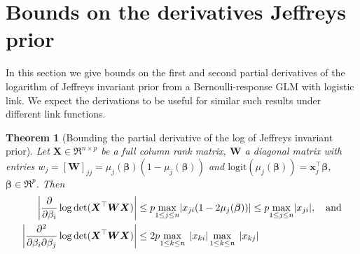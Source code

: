 \documentclass[11pt, a4paper]{article}
\newcommand*{\bb}{\boldsymbol}
\theoremstyle{example} \newtheorem{example}{Example}[section]
\theoremstyle{theorem} \newtheorem{theorem}{Theorem}[section]
\theoremstyle{theorem }\newtheorem{proposition}{Proposition}[section]
\theoremstyle{theorem }\newtheorem{corollary}{Corollary}[section]
\def\det{{\mathop{\rm det}}}
\def\\bbeta{\bb{\\bbeta}}
\begin{document}
	\section{Bounds on the derivatives Jeffreys prior}
\label{sec:jeffreys}
In this section we give bounds on the first and second partial derivatives of the logarithm of Jeffreys invariant prior from a Bernoulli-response GLM with logistic link. We expect the derivations to be useful for similar such results under different link functions. 
 
\begin{theorem}[Bounding the partial derivative of the log of Jeffreys invariant prior]\label{thm:jeffrey_deriv_bound}
	Let $\bb X \in \Re^{n \times p}$ be a full column rank matrix, 
	$\bb W$ a diagonal matrix with entries
	$w_j=[\bb W]_{jj} = \mu_j(\bb\beta)(1-\mu_j(\bb\beta))$ 
	and $\text{logit}(\mu_j(\bb\beta)) = \bb x_{j}^\top \bb\beta$, $\bb\beta \in \Re^p$. Then 
	\begin{align}\label{eq:jeffrey_deriv_bound1}
	\left|\frac{\partial }{\partial  \beta_i}\log \det(\bb X^\top\bb W\bb X)\right|  &\leq p\underset{1\leq j\leq n}{\max} |x_{ji}(1-2\mu_j(\bb\beta))| \leq p\underset{1\leq j\leq n}{\max} |x_{ji}|, \quad \text{and} \\ \label{eq:jeffrey_deriv_bound2}
	\left|	\frac{\partial^2}{\partial \beta_i \partial \beta_j} \log\det (\bb X^\top \bb W \bb X)\right| &\leq  2p\underset{1\leq k \leq n}{\max} \; \left|x_{ki}\right| \underset{1\leq k \leq n}{\max} \; \left|x_{kj}\right|
\end{align}
\end{theorem}
\end{document}
